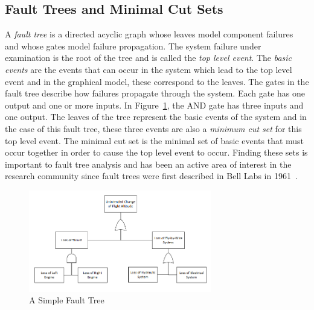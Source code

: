 \subsection{Fault Trees and Minimal Cut Sets}
\label{sec:saArtifacts}

A \emph{fault tree} is a directed acyclic graph whose leaves model component failures and whose gates model failure propagation. The system failure under examination is the root of the tree and is called the \emph{top level event}. The \emph{basic events} are the events that can occur in the system which lead to the top level event and in the graphical model, these correspond to the leaves. The gates in the fault tree describe how failures propagate through the system. Each gate has one output and one or more inputs. In Figure~\ref{fig:introFT}, the AND gate has three inputs and one output. The leaves of the tree represent the basic events of the system and in the case of this fault tree, these three events are also a \textit{minimum cut set} for this top level event. The minimal cut set is the minimal set of basic events that must occur together in order to cause the top level event to occur. Finding these sets is important to fault tree analysis and has been an active area of interest in the research community since fault trees were first described in Bell Labs in 1961~\cite{historyFTA, 0f356f05e72f43018211b36f97c8854a}. 

\begin{figure}[h]
\begin{center}
\includegraphics[width=8cm]{images/ft.png}
\caption{A Simple Fault Tree} \label{fig:introFT}
\end{center}
\end{figure}

